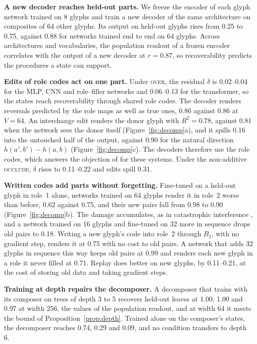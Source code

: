 \textbf{A new decoder reaches held-out parts.} We freeze the encoder of each glyph network trained on 8 glyphs and train a new decoder of the same architecture on composites of 64 other glyphs. Its output on held-out glyphs rises from 0.25 to 0.75, against 0.88 for networks trained end to end on 64 glyphs. Across architectures and vocabularies, the population readout of a frozen encoder correlates with the output of a new decoder at $r = 0.87$, so recoverability predicts the procedures a state can support.

\textbf{Edits of role codes act on one part.} Under \textsc{over}, the residual $\delta$ is 0.02--0.04 for the MLP, CNN and role--filler networks and 0.06--0.13 for the transformer, so the states reach recoverability through shared role codes. The decoder renders reversals predicted by the role maps as well as true ones, 0.86 against 0.86 at $V = 64$. An interchange edit renders the donor glyph with $R^2 = 0.78$, against 0.81 when the network sees the donor itself (Figure~\ref{fig:decomp}a), and it spills 0.16 into the untouched half of the output, against 0.90 for the natural direction $h(a', b') - h(a, b)$ (Figure~\ref{fig:decomp}c). The decoders therefore use the role codes, which answers the objection of \citet{fodor1990} for these systems. Under the non-additive \textsc{occlude}, $\delta$ rises to 0.11--0.22 and edits spill 0.31.

\textbf{Written codes add parts without forgetting.} Fine-tuned on a held-out glyph in role~1 alone, networks trained on 64 glyphs render it in role~2 worse than before, 0.62 against 0.75, and their new pairs fall from 0.98 to 0.90 (Figure~\ref{fig:decomp}b). The damage accumulates, as in catastrophic interference \citep{mccloskey1989}, and a network trained on 16 glyphs and fine-tuned on 32 more in sequence drops old pairs to 0.18. Writing a new glyph's code into role~2 through $B_2$, with no gradient step, renders it at 0.75 with no cost to old pairs. A network that adds 32 glyphs in sequence this way keeps old pairs at 0.99 and renders each new glyph in a role it never filled at 0.71. Replay does better on new glyphs, by 0.11--0.21, at the cost of storing old data and taking gradient steps.

\textbf{Training at depth repairs the decomposer.} A decomposer that trains with its composer on trees of depth 3 to 5 recovers held-out leaves at 1.00, 1.00 and 0.97 at width 256, the values of the population readout, and at width 64 it meets the bound of Proposition~\ref{prop:depth}. Trained alone on the composer's states, the decomposer reaches 0.74, 0.29 and 0.09, and no condition transfers to depth 6.


